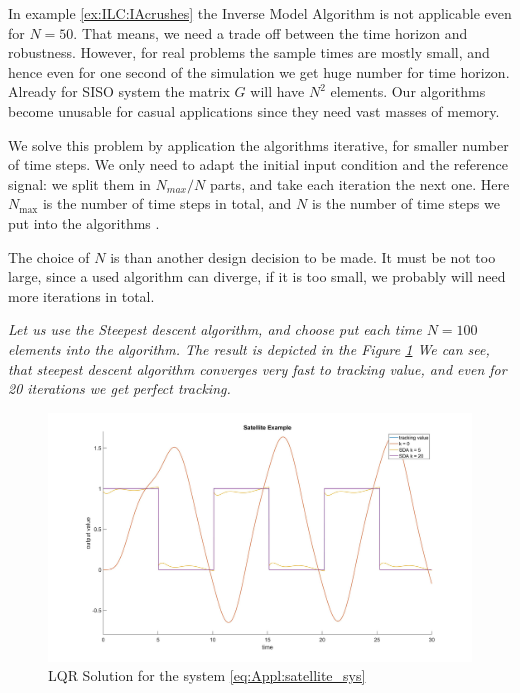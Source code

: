 	In example \ref{ex:ILC:IAcrushes} the Inverse Model Algorithm is not applicable even for $N = 50$. 
	That means, we need a trade off between the time horizon and robustness.
	However, for real problems the sample times are mostly small, and hence even for one second of the simulation we get huge number for time horizon. Already for SISO system the matrix $G$ will have $N^2$ elements. Our algorithms become unusable for casual applications since they need vast masses of memory.	
		
	We solve this problem by application the algorithms iterative, for smaller number of time steps. We only need to adapt the initial input condition and the reference signal: we split them in $N_{max}/N$ parts, and take each iteration the next one. Here $N_{\max}$ is the number of time steps in total, and $N$ is the number of time steps we put into the algorithms .
	
	The choice of $N$ is than another design  decision to be made. It must be not too large, since a used algorithm can diverge, if it is too small, we probably will need more iterations in total. 
	

\begin{example}[contined]
\textit{Let us use the Steepest descent algorithm, and choose put each time $N =100$ elements into the algorithm. 
The result is depicted in the Figure \ref{img:Appl:Sat_SDA} We can see, that steepest descent algorithm converges very fast to tracking value, and even for 20 iterations we get perfect tracking. 
}
	\begin{figure}[ht]
	\centering
	\includegraphics[width=\textwidth]{fig/Satellite_SDA.jpg}
	\caption{LQR Solution for the system \eqref{eq:Appl:satellite_sys}}
	\label{img:Appl:Sat_SDA}
\end{figure}



\end{example}    

	
	
	